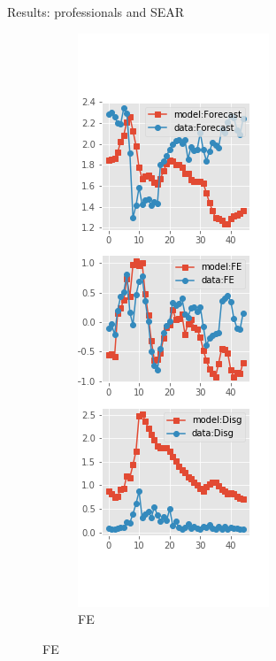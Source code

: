 \documentclass{beamer}
\begin{document}
\begin{frame}{Results: professionals and SEAR}
\begin{figure}[ht]
\begin{subfigure}[b]{0.19\textwidth}
		\end{subfigure}
		\hfill
		\begin{subfigure}[b]{0.19\textwidth}
			\caption{FE}
			\includegraphics[width=\textwidth, height = 0.8\textheight]{figuresDraft/spf_se_est_diag1.png}

\end{subfigure}
\end{figure}
\end{frame}
\end{document}
